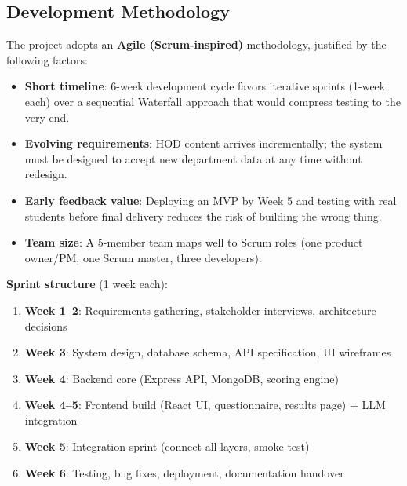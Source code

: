 ﻿\documentclass[12pt, a4paper]{article}
\begin{document}
\subsection{Development Methodology}

The project adopts an \textbf{Agile (Scrum-inspired)} methodology, justified by the following factors:

\begin{itemize}[leftmargin=1.5em, itemsep=3pt]
    \item \textbf{Short timeline}: 6-week development cycle favors iterative sprints (1-week each) over a sequential Waterfall approach that would compress testing to the very end.
    \item \textbf{Evolving requirements}: HOD content arrives incrementally; the system must be designed to accept new department data at any time without redesign.
    \item \textbf{Early feedback value}: Deploying an MVP by Week 5 and testing with real students before final delivery reduces the risk of building the wrong thing.
    \item \textbf{Team size}: A 5-member team maps well to Scrum roles (one product owner/PM, one Scrum master, three developers).
\end{itemize}

\textbf{Sprint structure} (1 week each):
\begin{enumerate}[leftmargin=1.5em, itemsep=2pt]
    \item \textbf{Week 1--2}: Requirements gathering, stakeholder interviews, architecture decisions
    \item \textbf{Week 3}: System design, database schema, API specification, UI wireframes
    \item \textbf{Week 4}: Backend core (Express API, MongoDB, scoring engine)
    \item \textbf{Week 4--5}: Frontend build (React UI, questionnaire, results page) + LLM integration
    \item \textbf{Week 5}: Integration sprint (connect all layers, smoke test)
    \item \textbf{Week 6}: Testing, bug fixes, deployment, documentation handover
\end{enumerate}
\end{document}
